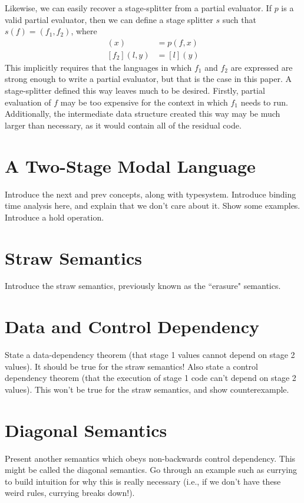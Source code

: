 \documentclass{sigplanconf}
\begin{document}
Likewise, we can easily recover a stage-splitter from a partial evaluator.  If $p$ is a valid partial evaluator, then we can define a stage splitter $s$ such that $s(f)=(f_1,f_2)$, where
\begin{align*}
[f_1](x) &= p (f,x) \\
[f_2](l,y) &= [l] (y)
\end{align*}
This implicitly requires that the languages in which $f_1$ and $f_2$ are expressed are strong enough to write a partial evaluator, but that is the case in this paper.  A stage-splitter defined this way leaves much to be desired.  Firstly, partial evaluation of $f$ may be too expensive for the context in which $f_1$ needs to run.  Additionally, the intermediate data structure created this way may be much larger than necessary, as it would contain all of the residual code.

\section{A Two-Stage Modal Language}

Introduce the next and prev concepts, along with typesystem.  Introduce binding time analysis here, and explain that we don't care about it.  Show some examples.  Introduce a hold operation.

\section{Straw Semantics}

Introduce the straw semantics, previously known as the ``erasure" semantics.

\section{Data and Control Dependency}

State a data-dependency theorem (that stage 1 values cannot depend on stage 2 values).  It should be true for the straw semantics!  Also state a control dependency theorem (that the execution of stage 1 code can't depend on stage 2 values).  This won't be true for the straw semantics, and show counterexample.

\section{Diagonal Semantics}

Present another semantics which obeys non-backwards control dependency.  This might be called the diagonal semantics.  Go through an example such as currying to build intuition for why this is really necessary (i.e., if we don't have these weird rules, currying breaks down!).
\end{document}
